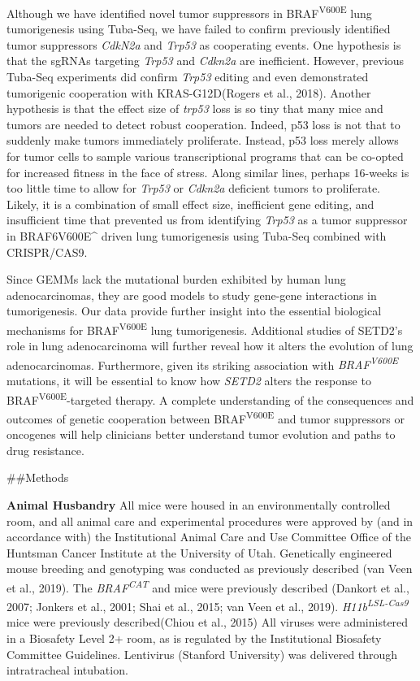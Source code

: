 Although we have identified novel tumor suppressors in BRAF\textsuperscript{V600E} lung tumorigenesis using Tuba-Seq, we have failed to confirm previously identified tumor suppressors \emph{CdkN2a} and \emph{Trp53} as cooperating events.
One hypothesis is that the sgRNAs targeting \emph{Trp53} and \emph{Cdkn2a} are inefficient. However, previous Tuba-Seq experiments did confirm \emph{Trp53} editing and even demonstrated tumorigenic cooperation with KRAS-G12D(Rogers et al., 2018).
Another hypothesis is that the effect size of \emph{trp53} loss is so tiny that many mice and tumors are needed to detect robust cooperation.
Indeed, p53 loss is not that to suddenly make tumors immediately proliferate.
Instead, p53 loss merely allows for tumor cells to sample various transcriptional programs that can be co-opted for increased fitness in the face of stress.
Along similar lines, perhaps 16-weeks is too little time to allow for \emph{Trp53} or \emph{Cdkn2a} deficient tumors to proliferate.
Likely, it is a combination of small effect size, inefficient gene editing, and insufficient time that prevented us from identifying \emph{Trp53} as a tumor suppressor in BRAF6V600E\^{} driven lung tumorigenesis using Tuba-Seq combined with CRISPR/CAS9.

Since GEMMs lack the mutational burden exhibited by human lung adenocarcinomas, they are good models to study gene-gene interactions in tumorigenesis.
Our data provide further insight into the essential biological mechanisms for BRAF\textsuperscript{V600E} lung tumorigenesis.
Additional studies of SETD2's role in lung adenocarcinoma will further reveal how it alters the evolution of lung adenocarcinomas.
Furthermore, given its striking association with \emph{BRAF\textsuperscript{V600E}} mutations, it will be essential to know how \emph{SETD2} alters the response to BRAF\textsuperscript{V600E}-targeted therapy.
A complete understanding of the consequences and outcomes of genetic cooperation between BRAF\textsuperscript{V600E} and tumor suppressors or oncogenes will help clinicians better understand tumor evolution and paths to drug resistance.

\#\#Methods

\textbf{Animal Husbandry} All mice were housed in an environmentally controlled room, and all animal care and experimental procedures were approved by (and in accordance with) the Institutional Animal Care and Use Committee Office of the Huntsman Cancer Institute at the University of Utah. Genetically engineered mouse breeding and genotyping was conducted as previously described (van Veen et al., 2019). The \emph{BRAF\textsuperscript{CAT}} and mice were previously described (Dankort et al., 2007; Jonkers et al., 2001; Shai et al., 2015; van Veen et al., 2019). \emph{H11b\textsuperscript{LSL-Cas9}} mice were previously described(Chiou et al., 2015) All viruses were administered in a Biosafety Level 2+ room, as is regulated by the Institutional Biosafety Committee Guidelines. Lentivirus (Stanford University) was delivered through intratracheal intubation.

